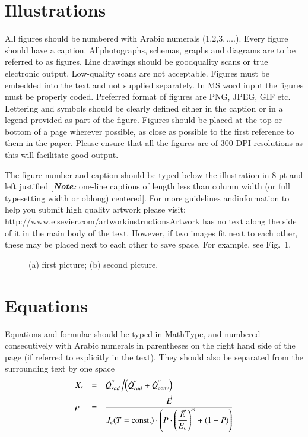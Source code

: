\documentclass[3p,times,procedia]{elsarticle}
\begin{document}
\section{Illustrations}
All figures should be numbered with Arabic numerals (1,2,3,$\,\ldots.$). Every figure should have a caption. All\break photographs, schemas, graphs and diagrams are to be referred to as figures. Line drawings should be good\break quality scans or true electronic output. Low-quality scans are not acceptable. Figures must be embedded into the text and not supplied separately. In MS word input the figures must be properly coded. Preferred format of figures are PNG, JPEG, GIF etc. Lettering and symbols should be clearly defined either in the caption or in a legend provided as part of the figure. Figures should be placed at the top or bottom of a page wherever possible, as close as possible to the first reference to them in the paper. Please ensure that all the figures are of 300 DPI resolutions as this will facilitate good output.

The figure number and caption should be typed below the illustration in 8 pt and left justified [{\bfseries\itshape Note:} one-line captions of length less than column width (or full typesetting width or oblong) centered]. For more guidelines and\break information to help you submit high quality artwork please visit: http://www.elsevier.com/artworkinstructions\break Artwork has no text along the side of it in the main body of the text. However, if two images fit next to each other, these may be placed next to each other to save space. For example, see Fig.~1.
\begin{figure}[t]\vspace*{4pt}
\caption{(a) first picture; (b) second picture.}
\end{figure}


\section{Equations}
Equations and formulae should be typed in MathType, and numbered consecutively with Arabic numerals in parentheses on the right hand side of the page (if referred to explicitly in the text). They should also be separated from the surrounding text by one space
\begin{equation}
\begin{array}{lcl}
\displaystyle X_r &=& \displaystyle\dot{Q}^{''}_{rad}\left/\left(\dot{Q}^{''}_{rad} + \dot{Q}^{''}_{conv}\right)\right.\\[6pt]
\displaystyle \rho &=& \displaystyle\frac{\vec{E}}{J_c(T={\rm const.})\cdot\left(P\cdot\left(\displaystyle\frac{\vec{E}}{E_c}\right)^m+(1-P)\right)}
\end{array}
\end{equation}
\end{document}
